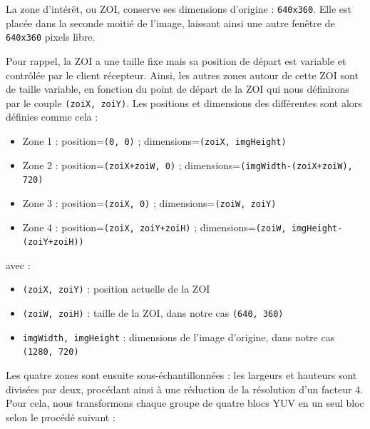\documentclass[11pt,a4paper]{article}
\begin{document}
\bigbreak
La zone d'intérêt, ou ZOI, conserve ses dimensions d'origine : \texttt{640x360}.
Elle est placée dans la seconde moitié de l'image, laissant ainsi une autre fenêtre de \texttt{640x360} pixels libre.

\bigbreak
Pour rappel, la ZOI a une taille fixe mais sa position de départ est variable et contrôlée par le client récepteur.
Ainsi, les autres zones autour de cette ZOI sont de taille variable, en fonction du point de départ de la ZOI qui nous définirons par le couple \texttt{(zoiX, zoiY)}.
Les positions et dimensions des différentes sont alors définies comme cela :
\bigbreak
\begin{itemize}
\item{Zone 1 : position=\texttt{(0, 0)} ; dimensions=\texttt{(zoiX, imgHeight)}}
\item{Zone 2 : position=\texttt{(zoiX+zoiW, 0)} ; dimensions=\texttt{(imgWidth-(zoiX+zoiW), 720)}}
\item{Zone 3 : position=\texttt{(zoiX, 0)} ; dimensions=\texttt{(zoiW, zoiY)}}
\item{Zone 4 : position=\texttt{(zoiX, zoiY+zoiH)} ; dimensions=\texttt{(zoiW, imgHeight-(zoiY+zoiH))}}
\end{itemize}

\bigbreak
avec :
\begin{itemize}
\item{\texttt{(zoiX, zoiY)} : position actuelle de la ZOI}
\item{\texttt{(zoiW, zoiH)} : taille de la ZOI, dans notre cas \texttt{(640, 360)}}
\item{\texttt{imgWidth, imgHeight} : dimensions de l'image d'origine, dans notre cas \texttt{(1280, 720)}}
\end{itemize}

\bigbreak
Les quatre zones sont ensuite sous-échantillonnées : les largeurs et hauteurs sont divisées par deux, procédant ainsi à une réduction de la résolution d'un facteur 4.
Pour cela, nous transformons chaque groupe de quatre blocs YUV en un seul bloc selon le procédé suivant :
\end{document}
